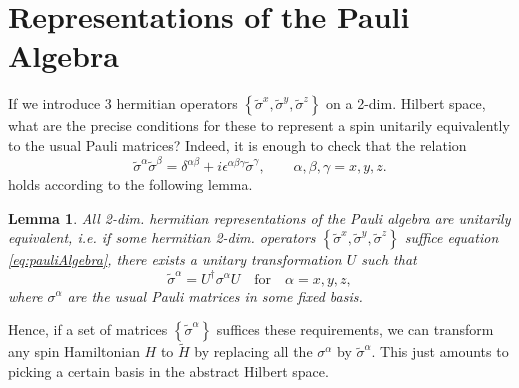 \documentclass[%
fontsize=12pt, %
twoside=off %
]{scrbook}
\newtheorem{lemma}{Lemma}
\begin{document}
\section{Representations of the Pauli Algebra}
\label{sec:representationsOfPauliAlgebra}

If we introduce 3 hermitian operators $\left\{\tilde\sigma^x,\tilde\sigma^y,\tilde\sigma^z\right\}$ on a 2-dim. Hilbert space, what are the precise conditions for these to represent a spin unitarily equivalently to the usual Pauli matrices? Indeed, it is enough to check that the relation
\begin{equation}
	\tilde\sigma^\alpha \tilde\sigma^\beta
	= \delta^{\alpha\beta}
	+ i\epsilon^{\alpha\beta\gamma}\tilde\sigma^\gamma,
	\qquad \alpha,\beta,\gamma=x,y,z.
	\label{eq:pauliAlgebra}
\end{equation}
holds according to the following lemma.
\begin{lemma}
	All 2-dim. hermitian representations of the Pauli algebra are unitarily equivalent, i.e. if some hermitian 2-dim. operators $\left\{\tilde\sigma^x,\tilde\sigma^y,\tilde\sigma^z\right\}$ suffice equation \ref{eq:pauliAlgebra}, there exists a unitary transformation $U$ such that
	\begin{equation}
		\tilde\sigma^\alpha = U^\dagger \sigma^\alpha U\quad\text{for}\quad\alpha=x,y,z,
	\end{equation}
	where $\sigma^\alpha$ are the usual Pauli matrices in some fixed basis.
\end{lemma}

Hence, if a set of matrices $\left\{\tilde\sigma^\alpha\right\}$ suffices these requirements, we can transform any spin Hamiltonian $H$ to $\tilde H$ by replacing all the $\sigma^\alpha$ by $\tilde\sigma^\alpha$. This just amounts to picking a certain basis in the abstract Hilbert space.
\end{document}
